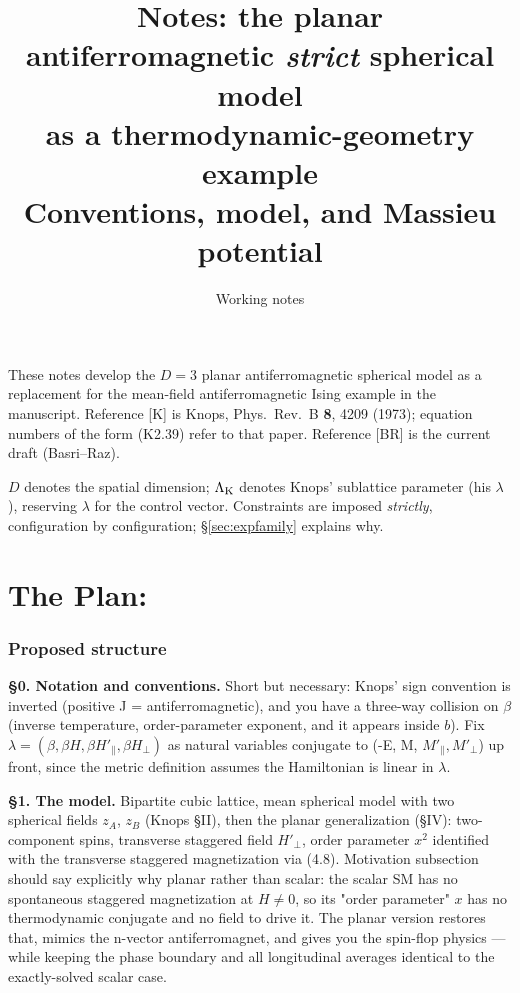 \documentclass[11pt,a4paper]{article}
\title{Notes: the planar antiferromagnetic \emph{strict} spherical model\\
as a thermodynamic-geometry example\\[2pt]\large Conventions, model, and Massieu potential }
\author{}
\date{Working notes }
\newcommand{\LK}{\Lambda_{\rm K}}
\begin{document}
\setcounter{section}{-1}
\maketitle

\noindent
These notes develop the $D=3$ planar antiferromagnetic spherical model as a replacement for
the mean-field antiferromagnetic Ising example in the manuscript. Reference [K] is Knops,
Phys.\ Rev.\ B \textbf{8}, 4209 (1973); equation numbers of the form (K2.39) refer to that
paper. Reference [BR] is the current draft (Basri--Raz).

$D$ denotes the spatial dimension; $\LK$ denotes Knops' sublattice parameter (his $\lambda$),
reserving $\lambda$ for the control vector. Constraints are imposed \emph{strictly},
configuration by configuration; \S\ref{sec:expfamily} explains why.

\section{The Plan:}

\subsubsection{Proposed structure}

\textbf{§0. Notation and conventions.} Short but necessary: Knops' sign convention is inverted (positive J = antiferromagnetic), and you have a three-way collision on $\beta$ (inverse temperature, order-parameter exponent, and it appears inside $b$). Fix $\lambda = (\beta, \beta H, \beta H'_{\parallel}, \beta H_{\perp})$ as natural variables conjugate to (-E, M, $M'_{\parallel},M'_{\perp}$) up front, since the metric definition assumes the Hamiltonian is linear in $\lambda$.

\textbf{§1. The model.} Bipartite cubic lattice, mean spherical model with two spherical fields $z_A$, $z_B$ (Knops §II), then the planar generalization (§IV): two-component spins, transverse staggered field $H'_\perp$, order parameter $x^2$ identified with the transverse staggered magnetization via (4.8). Motivation subsection should say explicitly why planar rather than scalar: the scalar SM has no spontaneous staggered magnetization at $H \neq 0$, so its "order parameter" $x$ has no thermodynamic conjugate and no field to drive it. The planar version restores that, mimics the n-vector antiferromagnet, and gives you the spin-flop physics --- while keeping the phase boundary and all longitudinal averages identical to the exactly-solved scalar case.
\end{document}
